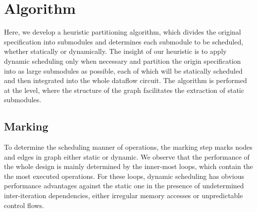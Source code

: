 \section{Algorithm} \label{sec:algorithm}
Here, we develop a heuristic partitioning algorithm, which divides the original specification into submodules and determines each submodule to be scheduled, whether statically or dynamically. 
The insight of our heuristic is to apply dynamic scheduling only when necessary and partition the origin specification into as large submodules as possible, each of which will be statically scheduled and then integrated into the whole dataflow circuit. 
The algorithm is performed at the \dsir{} level, where the structure of the \tor graph facilitates the extraction of static submodules. 



\subsection{Marking}

To determine the scheduling manner of operations, the marking step marks nodes and edges in \tor graph either static or dynamic. 
We observe that the performance of the whole design is mainly determined by the inner-most loops, which contain the the most executed operations. 
For these loops, dynamic scheduling has obvious performance advantages against the static one in the presence of undetermined inter-iteration dependencies, either irregular memory accesses or unpredictable control flows.

